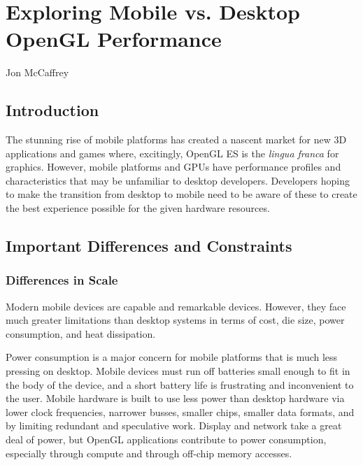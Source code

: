 \chapter{Exploring Mobile vs. Desktop OpenGL Performance}{Jon McCaffrey}
\label{Exploring-Mobile-vs-Desktop-OpenGL-Performance}

\section{Introduction}

The stunning rise of mobile platforms has created a nascent market for new 3D
applications and games where, excitingly, OpenGL ES is the \textit{lingua
franca} for graphics. However, mobile platforms and GPUs have performance
profiles and characteristics that may be unfamiliar to desktop
developers.  Developers hoping to make the transition from
desktop to mobile need to be aware of these to create the best experience
possible for the given hardware resources.

\section{Important Differences and Constraints}\label{Jon-McCaffrey:Constraints-Inspire-Creativity}

\subsection{Differences in Scale}
\label{Jon-McCaffrey:Architectural-Differences} Modern mobile devices are
capable and remarkable devices.  However, they face much greater limitations
than desktop systems in terms of cost, die size, power consumption, and heat
dissipation.

Power consumption is a major concern for mobile platforms that is much less
pressing on desktop.  Mobile devices must run off batteries small enough to fit
in the body of the device, and a short battery life is frustrating and
inconvenient to the user.  Mobile hardware is built to use less power than
desktop hardware via lower clock frequencies, narrower busses, smaller chips,
smaller data formats, and by limiting redundant and speculative work.  Display
and network take a great deal of power, but OpenGL applications contribute to
power consumption, especially through compute and through off-chip memory
accesses.

